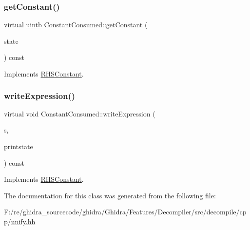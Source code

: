 \subsubsection{\texorpdfstring{getConstant()}{getConstant()}}
{\footnotesize\ttfamily virtual \mbox{\hyperlink{types_8h_a2db313c5d32a12b01d26ac9b3bca178f}{uintb}} Constant\+Consumed\+::get\+Constant (\begin{DoxyParamCaption}\item[{\mbox{\hyperlink{class_unify_state}{Unify\+State}} \&}]{state }\end{DoxyParamCaption}) const\hspace{0.3cm}{\ttfamily [virtual]}}



Implements \mbox{\hyperlink{class_r_h_s_constant_a941b5d2898cbce985a3ef9c5db6fa458}{R\+H\+S\+Constant}}.

\mbox{\label{class_constant_consumed_a5c8df9f2bf40e042610b157d5a15f3c0}} 
\subsubsection{\texorpdfstring{writeExpression()}{writeExpression()}}
{\footnotesize\ttfamily virtual void Constant\+Consumed\+::write\+Expression (\begin{DoxyParamCaption}\item[{ostream \&}]{s,  }\item[{\mbox{\hyperlink{class_unify_c_printer}{Unify\+C\+Printer}} \&}]{printstate }\end{DoxyParamCaption}) const\hspace{0.3cm}{\ttfamily [virtual]}}



Implements \mbox{\hyperlink{class_r_h_s_constant_a79e03c6da5320e24873a4fee25f91411}{R\+H\+S\+Constant}}.



The documentation for this class was generated from the following file\+:\begin{DoxyCompactItemize}
\item 
F\+:/re/ghidra\+\_\+sourcecode/ghidra/\+Ghidra/\+Features/\+Decompiler/src/decompile/cpp/\mbox{\hyperlink{unify_8hh}{unify.\+hh}}\end{DoxyCompactItemize}
